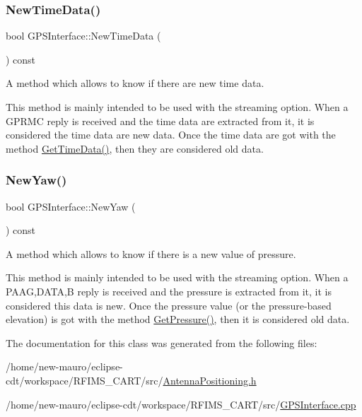 \subsubsection{\texorpdfstring{New\+Time\+Data()}{NewTimeData()}}
{\footnotesize\ttfamily bool G\+P\+S\+Interface\+::\+New\+Time\+Data (\begin{DoxyParamCaption}{ }\end{DoxyParamCaption}) const\hspace{0.3cm}{\ttfamily [inline]}}



A method which allows to know if there are new time data. 

This method is mainly intended to be used with the streaming option. When a G\+P\+R\+MC reply is received and the time data are extracted from it, it is considered the time data are new data. Once the time data are got with the method \hyperlink{classGPSInterface_acf5b6366242ce4828ba13d13f692b744}{Get\+Time\+Data()}, then they are considered old data. \mbox{\label{classGPSInterface_afdd55479e220aa489095de6034f644c7}} 
\subsubsection{\texorpdfstring{New\+Yaw()}{NewYaw()}}
{\footnotesize\ttfamily bool G\+P\+S\+Interface\+::\+New\+Yaw (\begin{DoxyParamCaption}{ }\end{DoxyParamCaption}) const\hspace{0.3cm}{\ttfamily [inline]}}



A method which allows to know if there is a new value of pressure. 

This method is mainly intended to be used with the streaming option. When a P\+A\+AG,D\+A\+TA,B reply is received and the pressure is extracted from it, it is considered this data is new. Once the pressure value (or the pressure-\/based elevation) is got with the method \hyperlink{classGPSInterface_ac0b9cef2de5103ee5ada0154cda9b326}{Get\+Pressure()}, then it is considered old data. 

The documentation for this class was generated from the following files\+:\begin{DoxyCompactItemize}
\item 
/home/new-\/mauro/eclipse-\/cdt/workspace/\+R\+F\+I\+M\+S\+\_\+\+C\+A\+R\+T/src/\hyperlink{AntennaPositioning_8h}{Antenna\+Positioning.\+h}\item 
/home/new-\/mauro/eclipse-\/cdt/workspace/\+R\+F\+I\+M\+S\+\_\+\+C\+A\+R\+T/src/\hyperlink{GPSInterface_8cpp}{G\+P\+S\+Interface.\+cpp}\end{DoxyCompactItemize}
